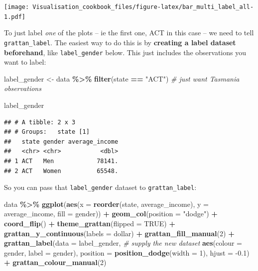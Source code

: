 \documentclass[
]{book}
\newenvironment{Shaded}{\begin{snugshade}}{\end{snugshade}}
\newcommand{\CommentTok}[1]{\textcolor[rgb]{0.56,0.35,0.01}{\textit{#1}}}
\newcommand{\DataTypeTok}[1]{\textcolor[rgb]{0.13,0.29,0.53}{#1}}
\newcommand{\DecValTok}[1]{\textcolor[rgb]{0.00,0.00,0.81}{#1}}
\newcommand{\FloatTok}[1]{\textcolor[rgb]{0.00,0.00,0.81}{#1}}
\newcommand{\KeywordTok}[1]{\textcolor[rgb]{0.13,0.29,0.53}{\textbf{#1}}}
\newcommand{\NormalTok}[1]{#1}
\newcommand{\OperatorTok}[1]{\textcolor[rgb]{0.81,0.36,0.00}{\textbf{#1}}}
\newcommand{\OtherTok}[1]{\textcolor[rgb]{0.56,0.35,0.01}{#1}}
\newcommand{\StringTok}[1]{\textcolor[rgb]{0.31,0.60,0.02}{#1}}
\begin{document}
\texttt{[image: Visualisation\_cookbook\_files/figure-latex/bar\_multi\_label\_all-1.pdf]}

To just label \emph{one} of the plots -- ie the first one, ACT in this case -- we need to tell \texttt{grattan\_label}. The easiest way to do this is by \textbf{creating a label dataset beforehand}, like \texttt{label\_gender} below. This just includes the observations you want to label:

\begin{Shaded}
\begin{Highlighting}[]
\NormalTok{label\_gender \textless{}{-}}\StringTok{ }\NormalTok{data }\OperatorTok{\%\textgreater{}\%}\StringTok{ }
\StringTok{  }\KeywordTok{filter}\NormalTok{(state }\OperatorTok{==}\StringTok{ "ACT"}\NormalTok{)  }\CommentTok{\# just want Tasmania observations}

\NormalTok{label\_gender}
\end{Highlighting}
\end{Shaded}

\begin{verbatim}
## # A tibble: 2 x 3
## # Groups:   state [1]
##   state gender average_income
##   <chr> <chr>           <dbl>
## 1 ACT   Men            78141.
## 2 ACT   Women          65548.
\end{verbatim}

So you can pass that \texttt{label\_gender} dataset to \texttt{grattan\_label}:

\begin{Shaded}
\begin{Highlighting}[]
\NormalTok{data }\OperatorTok{\%\textgreater{}\%}\StringTok{ }
\StringTok{  }\KeywordTok{ggplot}\NormalTok{(}\KeywordTok{aes}\NormalTok{(}\DataTypeTok{x =} \KeywordTok{reorder}\NormalTok{(state, average\_income), }
             \DataTypeTok{y =}\NormalTok{ average\_income,}
             \DataTypeTok{fill =}\NormalTok{ gender)) }\OperatorTok{+}\StringTok{ }
\StringTok{  }\KeywordTok{geom\_col}\NormalTok{(}\DataTypeTok{position =} \StringTok{"dodge"}\NormalTok{) }\OperatorTok{+}\StringTok{ }
\StringTok{  }\KeywordTok{coord\_flip}\NormalTok{() }\OperatorTok{+}\StringTok{ }
\StringTok{  }\KeywordTok{theme\_grattan}\NormalTok{(}\DataTypeTok{flipped =} \OtherTok{TRUE}\NormalTok{) }\OperatorTok{+}\StringTok{ }
\StringTok{  }\KeywordTok{grattan\_y\_continuous}\NormalTok{(}\DataTypeTok{labels =}\NormalTok{ dollar) }\OperatorTok{+}\StringTok{ }
\StringTok{  }\KeywordTok{grattan\_fill\_manual}\NormalTok{(}\DecValTok{2}\NormalTok{) }\OperatorTok{+}\StringTok{ }
\StringTok{  }\KeywordTok{grattan\_label}\NormalTok{(}\DataTypeTok{data =}\NormalTok{ label\_gender,  }\CommentTok{\# supply the new dataset}
                \KeywordTok{aes}\NormalTok{(}\DataTypeTok{colour =}\NormalTok{ gender,}
                    \DataTypeTok{label =}\NormalTok{ gender), }
                \DataTypeTok{position =} \KeywordTok{position\_dodge}\NormalTok{(}\DataTypeTok{width =} \DecValTok{1}\NormalTok{), }
                \DataTypeTok{hjust =} \FloatTok{{-}0.1}\NormalTok{) }\OperatorTok{+}\StringTok{ }
\StringTok{  }\KeywordTok{grattan\_colour\_manual}\NormalTok{(}\DecValTok{2}\NormalTok{)}
\end{Highlighting}
\end{Shaded}
\end{document}
